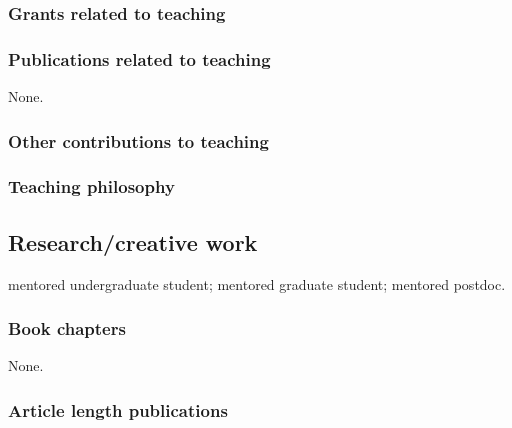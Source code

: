 \subsubsection{Grants related to teaching}


\subsubsection{Publications related to teaching}
None.

\subsubsection{Other contributions to teaching}


\subsubsection{Teaching philosophy}


\subsection{Research/creative work}
\ugsymbol{}mentored undergraduate student;
\phdsymbol{}mentored graduate student;
\postdocsymbol{}mentored postdoc.

\subsubsection{Book chapters}
None.

\subsubsection{Article length publications}



